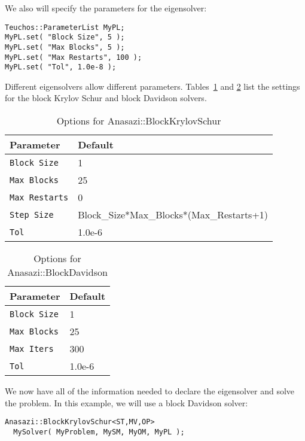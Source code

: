 We also will specify the parameters for the eigensolver:
\begin{verbatim}
Teuchos::ParameterList MyPL;
MyPL.set( "Block Size", 5 );
MyPL.set( "Max Blocks", 5 );
MyPL.set( "Max Restarts", 100 );
MyPL.set( "Tol", 1.0e-8 );
\end{verbatim}
Different eigensolvers allow different parameters.
Tables~\ref{tab:anasazi:bksparams} and \ref{tab:anasazi:bdparams} list
the settings for the block Krylov Schur and block Davidson solvers.


\begin{table}
\begin{center}
\begin{tabular}{| p{4cm} l |}
\hline
Parameter & Default \\
\hline
{\tt Block Size}   & 1      \\
{\tt Max Blocks}   & 25     \\
{\tt Max Restarts} & 0      \\
{\tt Step Size}    & Block\_Size*Max\_Blocks*(Max\_Restarts+1) \\
{\tt Tol}          & 1.0e-6 \\
\hline
\end{tabular}
\caption{Options for Anasazi::BlockKrylovSchur}
\label{tab:anasazi:bksparams}
\end{center}
\end{table}


\begin{table}
\begin{center}
\begin{tabular}{| p{4cm} l |}
\hline
Parameter & Default \\
\hline
{\tt Block Size} & 1      \\
{\tt Max Blocks} & 25     \\
{\tt Max Iters}  & 300    \\
{\tt Tol}        & 1.0e-6 \\
\hline
\end{tabular}
\caption{Options for Anasazi::BlockDavidson}
\label{tab:anasazi:bdparams}
\end{center}
\end{table}

We now have all of the information needed to declare the eigensolver
and solve the problem. In this example, we will use a block Davidson
solver:
\begin{verbatim}
Anasazi::BlockKrylovSchur<ST,MV,OP> 
  MySolver( MyProblem, MySM, MyOM, MyPL );
\end{verbatim}

